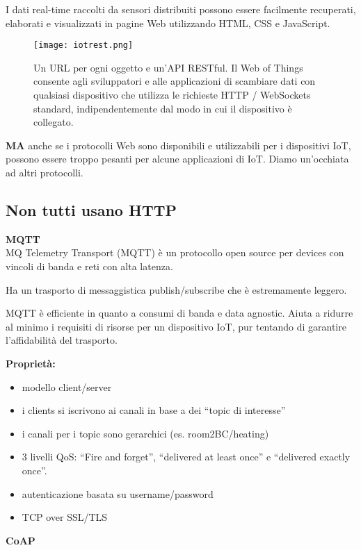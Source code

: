 I dati real-time raccolti da sensori distribuiti possono essere facilmente
recuperati, elaborati e visualizzati in pagine Web utilizzando HTML, CSS e
JavaScript.

\begin{figure}[H]
  \centering
  \texttt{[image: iotrest.png]}
  \caption{Un URL per ogni oggetto e un'API RESTful.
Il Web of Things consente agli sviluppatori e alle applicazioni di scambiare
dati con qualsiasi dispositivo che utilizza le richieste HTTP / WebSockets
standard, indipendentemente dal modo in cui il dispositivo è collegato.}
  \label{fig:iotrest}
\end{figure}

\textbf{MA} anche se i protocolli Web sono disponibili e utilizzabili per i
dispositivi IoT, possono essere troppo pesanti per alcune applicazioni di IoT.
Diamo un'occhiata ad altri protocolli.

\subsection{Non tutti usano HTTP}

\textbf{MQTT}\\

MQ Telemetry Transport (MQTT) è un protocollo open source per devices con
vincoli di banda e reti con alta latenza.

Ha un trasporto di messaggistica publish/subscribe che è estremamente leggero.

MQTT è efficiente in quanto a consumi di banda e data agnostic.
Aiuta a ridurre al minimo i requisiti di risorse per un dispositivo IoT,
pur tentando di garantire l'affidabilità del trasporto.

\textbf{Proprietà:}

\begin{itemize}
  \item modello client/server
  \item i clients si iscrivono ai canali in base a dei ``topic di interesse''
  \item i canali per i topic sono gerarchici (es. room2BC/heating)
  \item 3 livelli QoS: ``Fire and forget'',  ``delivered at least once'' e
 ``delivered exactly once''.
  \item autenticazione basata su username/password
  \item TCP over SSL/TLS
\end{itemize}

\textbf{CoAP}\\

